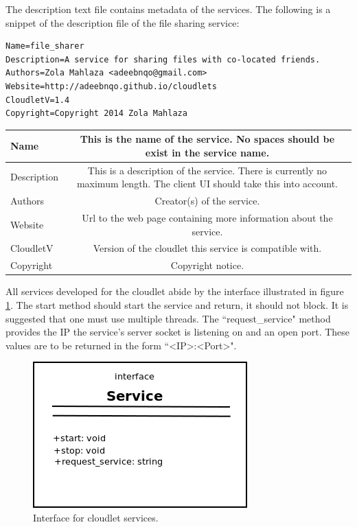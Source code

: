 The description text file contains metadata of the services. The following is a  snippet of the description file of the file sharing service:

\begin{lstlisting}
Name=file_sharer
Description=A service for sharing files with co-located friends.
Authors=Zola Mahlaza <adeebnqo@gmail.com>
Website=http://adeebnqo.github.io/cloudlets
CloudletV=1.4
Copyright=Copyright 2014 Zola Mahlaza
\end{lstlisting}


\begin{center}
\begin{tabular}{ l | c }
  \hline                       
  Name & This is the name of the service. No spaces should be exist in the service name. \\ \hline
  Description & This is a description of the service. There is currently no maximum length. The client UI should take this into account. \\ \hline
  Authors & Creator(s) of the service. \\ \hline
  Website & Url to the web page containing more information about the service. \\ \hline
  CloudletV & Version of the cloudlet this service is compatible with. \\ \hline
  Copyright & Copyright notice. \\
  \hline  
\end{tabular}
\end{center}

All services developed for the cloudlet abide by the interface illustrated in figure \ref{fig:serviceinterface}. The start method should start the service and return, it should not block. It is suggested that one must use multiple threads.
The ``request\_service" method provides the IP the service's server socket is listening on and an open port. These values are to be returned in the form ``<IP>:<Port>".

\begin{figure}[!h]
\centering
\includegraphics{figures/serviceinterface}
\caption{Interface for cloudlet services.}
\label{fig:serviceinterface}
\end{figure}

